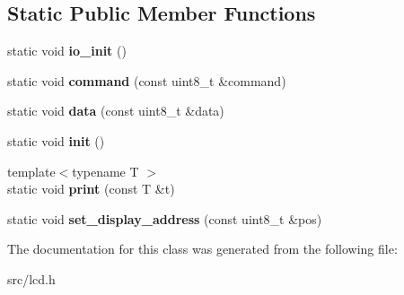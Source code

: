 \subsection*{Static Public Member Functions}
\begin{DoxyCompactItemize}
\item 
static void {\bfseries io\+\_\+init} ()\hypertarget{classLcd_a74bcd553e61d9f9c052a2ada7696c1e6}{}\label{classLcd_a74bcd553e61d9f9c052a2ada7696c1e6}

\item 
static void {\bfseries command} (const uint8\+\_\+t \&command)\hypertarget{classLcd_ac7183eb4a448aa052c49503c902ca261}{}\label{classLcd_ac7183eb4a448aa052c49503c902ca261}

\item 
static void {\bfseries data} (const uint8\+\_\+t \&data)\hypertarget{classLcd_a12e1dfd8741ff8f9abcf4cedb976f46e}{}\label{classLcd_a12e1dfd8741ff8f9abcf4cedb976f46e}

\item 
static void {\bfseries init} ()\hypertarget{classLcd_aefedfd3decc17d6c0a250a15af9053ac}{}\label{classLcd_aefedfd3decc17d6c0a250a15af9053ac}

\item 
{\footnotesize template$<$typename T $>$ }\\static void {\bfseries print} (const T \&t)\hypertarget{classLcd_ad6128575affb14846b529c8453a1a5a8}{}\label{classLcd_ad6128575affb14846b529c8453a1a5a8}

\item 
static void {\bfseries set\+\_\+display\+\_\+address} (const uint8\+\_\+t \&pos)\hypertarget{classLcd_a45f400406b7cb57ee26d5eab703b6d1a}{}\label{classLcd_a45f400406b7cb57ee26d5eab703b6d1a}

\end{DoxyCompactItemize}


The documentation for this class was generated from the following file\+:\begin{DoxyCompactItemize}
\item 
src/lcd.\+h\end{DoxyCompactItemize}
